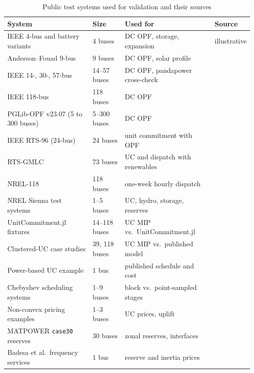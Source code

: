 \begin{table}[t]
  \centering
  \caption{Public test systems used for validation and their sources}
  \label{tab:test_systems}
  \small
  \setlength{\tabcolsep}{4pt}
  \begin{tabular}{@{}llll@{}}
    \toprule
    \textbf{System} & \textbf{Size} & \textbf{Used for} & \textbf{Source} \\
    \midrule
    IEEE 4-bus and battery variants & 4 buses & DC OPF, storage, expansion & illustrative \\
    Anderson--Fouad 9-bus & 9 buses & DC OPF, solar profile & \cite{anderson2002power} \\
    IEEE 14-, 30-, 57-bus & 14--57 buses & DC OPF, pandapower cross-check & \cite{pstca, ieee30bus, ieee57bus, thurner2018pandapower} \\
    IEEE 118-bus & 118 buses & DC OPF & \cite{pstca, pglibopf2019} \\
    PGLib-OPF v23.07 (5 to 300 buses) & 5--300 buses & DC OPF & \cite{pglibopf2019} \\
    IEEE RTS-96 (24-bus) & 24 buses & unit commitment with OPF & \cite{grigg1999rts96, pglibopf2019} \\
    RTS-GMLC & 73 buses & UC and dispatch with renewables & \cite{barrows2020rtsgmlc} \\
    NREL-118 & 118 buses & one-week hourly dispatch & \cite{pena2018nrel118, powersimulations} \\
    NREL Sienna test systems & 1--5 buses & UC, hydro, storage, reserves & \cite{lara2021powersystems, powersimulations} \\
    UnitCommitment.jl fixtures & 14--118 buses & UC MIP vs.\ UnitCommitment.jl & \cite{xavier2024ucjl} \\
    Clustered-UC case studies & 39, 118 buses & UC MIP vs.\ published model & \cite{morales2019cuc, cucdata} \\
    Power-based UC example & 1 bus & published schedule and cost & \cite{philipsen2019trading} \\
    Chebyshev scheduling systems & 1--9 buses & block vs.\ point-sampled stages & \cite{matus2015chebyshev} \\
    Non-convex pricing examples & 1--3 buses & UC prices, uplift & \cite{oneill2005pricing, gribik2007convexhull, hua2017convexhull} \\
    MATPOWER \texttt{case30} reserves & 30 buses & zonal reserves, interfaces & \cite{matpower_case30} \\
    Badesa et al.\ frequency services & 1 bus & reserve and inertia prices & \cite{badesa2020pricing} \\

\end{tabular}
\end{table}
